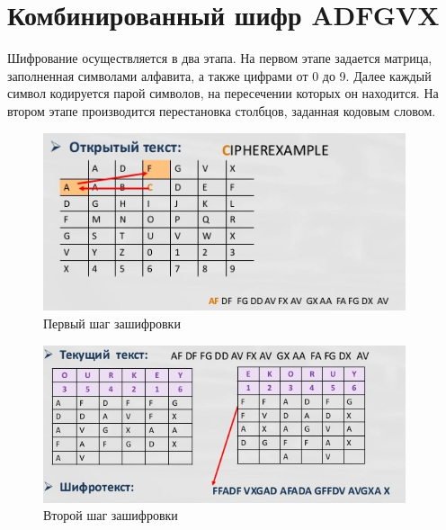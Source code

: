 \documentclass[a4paper, 14pt]{extarticle}
\begin{document}
\FloatBarrier{}
\section{Комбинированный шифр ADFGVX}
Шифрование осуществляется в два этапа. На первом этапе задается матрица, заполненная символами алфавита, а также цифрами от 0 до 9. Далее каждый символ кодируется парой символов, на пересечении которых он находится. На втором этапе производится перестановка столбцов, заданная кодовым словом.

\begin{figure}[h]
    \centering
    \includegraphics[width=0.95\textwidth]{./img/S001.jpg}
    \caption{Первый шаг зашифровки}%
    \label{img:2:1}
\end{figure}

\begin{figure}[h]
    \centering
    \includegraphics[width=0.95\textwidth]{./img/S002.jpg}
    \caption{Второй шаг зашифровки}%
    \label{img:2:2}
\end{figure}
\end{document}
